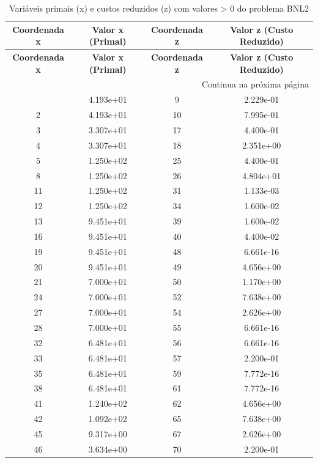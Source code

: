 \documentclass[12pt]{article}
\begin{document}
\begin{longtable}{@{}cccc@{}}
\caption{Variáveis primais (x) e custos reduzidos (z) com valores > 0 do problema BNL2} \\
\toprule
\textbf{Coordenada x} & \textbf{Valor x (Primal)} & \textbf{Coordenada z} & \textbf{Valor z (Custo Reduzido)} \\
\midrule
\endfirsthead

\toprule
\textbf{Coordenada x} & \textbf{Valor x (Primal)} & \textbf{Coordenada z} & \textbf{Valor z (Custo Reduzido)} \\
\midrule
\endhead

\midrule \multicolumn{4}{r}{{Continua na próxima página}} \\ \midrule
\endfoot

\bottomrule
\endlastfoot
1 & 4.193e+01 & 9 & 2.229e-01 \\
2 & 4.193e+01 & 10 & 7.995e-01 \\
3 & 3.307e+01 & 17 & 4.400e-01 \\
4 & 3.307e+01 & 18 & 2.351e+00 \\
5 & 1.250e+02 & 25 & 4.400e-01 \\
8 & 1.250e+02 & 26 & 4.804e+01 \\
11 & 1.250e+02 & 31 & 1.133e-03 \\
12 & 1.250e+02 & 34 & 1.600e-02 \\
13 & 9.451e+01 & 39 & 1.600e-02 \\
16 & 9.451e+01 & 40 & 4.400e-02 \\
19 & 9.451e+01 & 48 & 6.661e-16 \\
20 & 9.451e+01 & 49 & 4.656e+00 \\
21 & 7.000e+01 & 50 & 1.170e+00 \\
24 & 7.000e+01 & 52 & 7.638e+00 \\
27 & 7.000e+01 & 54 & 2.626e+00 \\
28 & 7.000e+01 & 55 & 6.661e-16 \\
32 & 6.481e+01 & 56 & 6.661e-16 \\
33 & 6.481e+01 & 57 & 2.200e-01 \\
35 & 6.481e+01 & 59 & 7.772e-16 \\
38 & 6.481e+01 & 61 & 7.772e-16 \\
41 & 1.240e+02 & 62 & 4.656e+00 \\
42 & 1.092e+02 & 65 & 7.638e+00 \\
45 & 9.317e+00 & 67 & 2.626e+00 \\
46 & 3.634e+00 & 70 & 2.200e-01 \\

\end{longtable}
\end{document}
